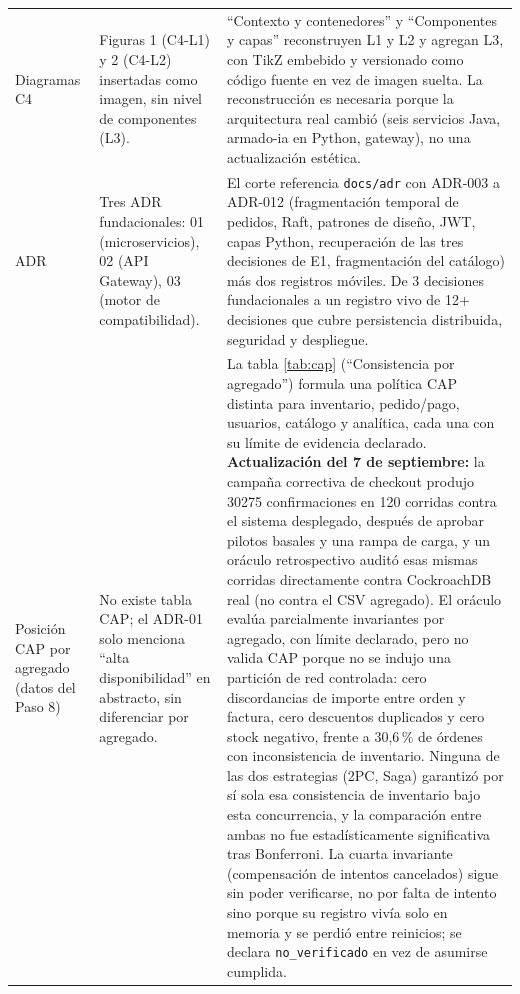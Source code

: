 \documentclass[12pt,a4paper]{article}
\begin{document}
\begin{longtable}{>{\raggedright\arraybackslash}p{2.9cm}>{\raggedright\arraybackslash}p{5.5cm}>{\raggedright\arraybackslash}p{6.2cm}}
2.4 Diagramas C4 &
Figuras 1 (C4-L1) y 2 (C4-L2) insertadas como imagen, sin nivel de componentes (L3). &
``Contexto y contenedores'' y ``Componentes y capas'' reconstruyen L1 y L2 y agregan L3, con TikZ embebido y versionado como código fuente en vez de imagen suelta. La reconstrucción es necesaria porque la arquitectura real cambió (seis servicios Java, armado-ia en Python, gateway), no una actualización estética.\\

2.5 ADR &
Tres ADR fundacionales: 01 (microservicios), 02 (API Gateway), 03 (motor de compatibilidad). &
El corte referencia \texttt{docs/adr} con ADR-003 a ADR-012 (fragmentación temporal de pedidos, Raft, patrones de diseño, JWT, capas Python, recuperación de las tres decisiones de E1, fragmentación del catálogo) más dos registros móviles. De 3 decisiones fundacionales a un registro vivo de 12+ decisiones que cubre persistencia distribuida, seguridad y despliegue.\\

2.6 Posición CAP por agregado (datos del Paso 8) &
No existe tabla CAP; el ADR-01 solo menciona ``alta disponibilidad'' en abstracto, sin diferenciar por agregado. &
La tabla \ref{tab:cap} (``Consistencia por agregado'') formula una política CAP distinta para inventario, pedido/pago, usuarios, catálogo y analítica, cada una con su límite de evidencia declarado. \textbf{Actualización del 7 de septiembre:} la campaña correctiva de checkout produjo 30275 confirmaciones en 120 corridas contra el sistema desplegado, después de aprobar pilotos basales y una rampa de carga, y un oráculo retrospectivo auditó esas mismas corridas directamente contra CockroachDB real (no contra el CSV agregado). El oráculo evalúa parcialmente invariantes por agregado, con límite declarado, pero no valida CAP porque no se indujo una partición de red controlada: cero discordancias de importe entre orden y factura, cero descuentos duplicados y cero stock negativo, frente a 30,6\,\% de órdenes con inconsistencia de inventario. Ninguna de las dos estrategias (2PC, Saga) garantizó por sí sola esa consistencia de inventario bajo esta concurrencia, y la comparación entre ambas no fue estadísticamente significativa tras Bonferroni. La cuarta invariante (compensación de intentos cancelados) sigue sin poder verificarse, no por falta de intento sino porque su registro vivía solo en memoria y se perdió entre reinicios; se declara \texttt{no\_verificado} en vez de asumirse cumplida.\\


\end{longtable}
\end{document}
